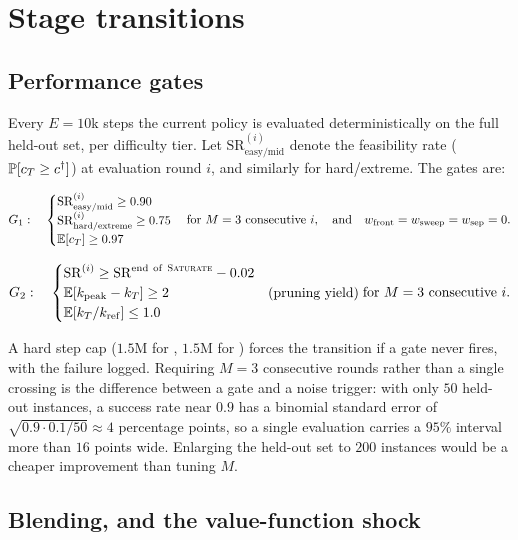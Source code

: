 \documentclass[11pt,a4paper]{article}
\begin{document}
\section{Stage transitions}\label{sec:transitions}

\subsection{Performance gates}

Every $E = 10$k steps the current policy is evaluated deterministically on the full held-out
set, per difficulty tier. Let $\mathrm{SR}^{(i)}_\mathrm{easy/mid}$ denote the feasibility
rate ($\mathbb{P}[c_T \ge c^{\dagger}]$) at evaluation round $i$, and similarly for
hard/extreme. The gates are:

\[
G_1:\quad
\begin{cases}
  \mathrm{SR}_{\mathrm{easy/mid}}^{(i)} \ge 0.90 & \\
  \mathrm{SR}_{\mathrm{hard/extreme}}^{(i)} \ge 0.75 & \\
  \mathbb{E}[c_T] \ge 0.97 &
\end{cases}
\text{for } M = 3 \text{ consecutive } i,
\quad\text{and}\quad w_{\mathrm{front}} = w_{\mathrm{sweep}} = w_{\mathrm{sep}} = 0 .
\]

\[
G_2:\quad
\begin{cases}
  \mathrm{SR}^{(i)} \ge \mathrm{SR}^{\mathrm{end\ of\ \textsc{Saturate}{}}} - 0.02 & \\
  \mathbb{E}[k_{\mathrm{peak}} - k_T] \ge 2 & \text{(pruning yield)}\\
  \mathbb{E}[k_T / k_{\mathrm{ref}}] \le 1.0 &
\end{cases}
\text{for } M = 3 \text{ consecutive } i .
\]

A hard step cap ($1.5$M for \stageI{}, $1.5$M for \stageII{}) forces the transition if a gate
never fires, with the failure logged. Requiring $M = 3$ consecutive rounds rather than a
single crossing is the difference between a gate and a noise trigger: with only $50$
held-out instances, a success rate near $0.9$ has a binomial standard error of
$\sqrt{0.9 \cdot 0.1 / 50} \approx 4$ percentage points, so a single evaluation carries a
$95\%$ interval more than $16$ points wide. Enlarging the held-out set to $200$ instances
would be a cheaper improvement than tuning $M$.

\subsection{Blending, and the value-function shock}
\end{document}

